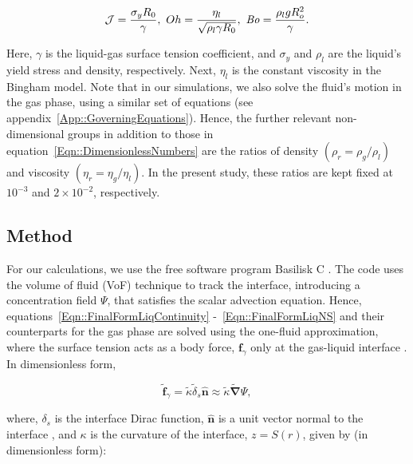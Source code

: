 \begin{equation}\label{Eqn::DimensionlessNumbers}
	\mathcal{J} = \frac{\sigma_yR_0}{\gamma},\,\,Oh = \frac{\eta_l}{\sqrt{\rho_l\gamma R_0}},\,\,\mathit{Bo} = \frac{\rho_l gR_o^2}{\gamma}.
\end{equation}

\noindent Here, $\gamma$ is the liquid-gas surface tension coefficient, and $\sigma_y$ and $\rho_l$ are the liquid's yield stress and density, respectively. Next, $\eta_l$ is the constant viscosity in the Bingham model. Note that in our simulations, we also solve the fluid's motion in the gas phase, using a similar set of equations (see appendix~\ref{App::GoverningEquations}). Hence, the further relevant non-dimensional groups in addition to those in equation~\eqref{Eqn::DimensionlessNumbers} are the ratios of density $\left(\rho_r = \rho_g/\rho_l\right)$ and viscosity $\left(\eta_r = \eta_g/\eta_l\right)$. In the present study, these ratios are kept fixed at $10^{-3}$ and $2 \times 10^{-2}$, respectively. 

\subsection{Method}\label{Sec::Method}

For our calculations, we use the free software program Basilisk C \citep{basiliskpopinet1, popinet2015quadtree}.  The code uses the volume of fluid (VoF) technique \citep{prosperetti2009computational, tryggvason2011direct} to track the interface, introducing a concentration field $\Psi$, that satisfies the scalar advection equation. Hence, equations~\eqref{Eqn::FinalFormLiqContinuity} -~\eqref{Eqn::FinalFormLiqNS} and their counterparts for the gas phase are solved using the one-fluid approximation, where the surface tension acts as a body force, $\boldsymbol{f}_\gamma$ only at the gas-liquid interface \citep{brackbill1992continuum, popinet2009accurate}. In dimensionless form,

\begin{equation}\label{Ch7::Eqn::SurfaceTension}
	\boldsymbol{\tilde{f}}_\gamma = \tilde{\kappa}\tilde{\delta}_s\hat{\boldsymbol{n}} \approx \tilde{\kappa}\boldsymbol{\tilde{\nabla}}\Psi,
\end{equation}
%

where, $\delta_s$ is the interface Dirac function, $\hat{\boldsymbol{n}}$ is a unit vector normal to the interface \citep{tryggvason2011direct}, and $\kappa$ is the curvature of the interface, $z = S(r)$, given by \cite[p.~14-16]{deserno2004notes} (in dimensionless form):


